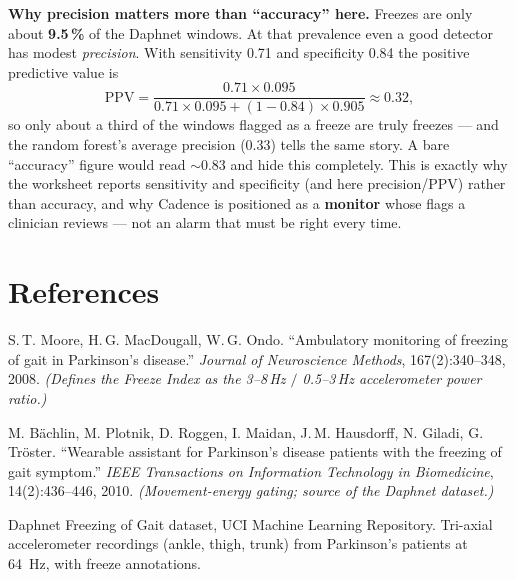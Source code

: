 \documentclass[11pt,a4paper]{article}
\begin{document}
\begin{keybox}
\textbf{Why precision matters more than ``accuracy'' here.} Freezes are only about
\textbf{9.5\,\%} of the Daphnet windows. At that prevalence even a good detector has
modest \emph{precision}. With sensitivity 0.71 and specificity 0.84 the positive
predictive value is
\[
\mathrm{PPV}=\frac{0.71\times0.095}{0.71\times0.095+(1-0.84)\times0.905}\approx 0.32,
\]
so only about a third of the windows flagged as a freeze are truly freezes --- and the
random forest's average precision (0.33) tells the same story. A bare ``accuracy''
figure would read $\sim$0.83 and hide this completely. This is exactly why the
worksheet reports sensitivity and specificity (and here precision/PPV) rather than
accuracy, and why Cadence is positioned as a \textbf{monitor} whose flags a clinician
reviews --- not an alarm that must be right every time.
\end{keybox}

\section*{References}
\begin{enumerate}[leftmargin=1.8em,label={[\arabic*]}]
\item S.\,T. Moore, H.\,G. MacDougall, W.\,G. Ondo. ``Ambulatory monitoring of
freezing of gait in Parkinson's disease.'' \emph{Journal of Neuroscience Methods},
167(2):340--348, 2008. \emph{(Defines the Freeze Index as the 3--8\,Hz $/$ 0.5--3\,Hz
accelerometer power ratio.)}
\item M. B\"achlin, M. Plotnik, D. Roggen, I. Maidan, J.\,M. Hausdorff, N. Giladi,
G. Tr\"oster. ``Wearable assistant for Parkinson's disease patients with the freezing
of gait symptom.'' \emph{IEEE Transactions on Information Technology in Biomedicine},
14(2):436--446, 2010. \emph{(Movement-energy gating; source of the Daphnet dataset.)}
\item Daphnet Freezing of Gait dataset, UCI Machine Learning Repository. Tri-axial
accelerometer recordings (ankle, thigh, trunk) from Parkinson's patients at
\SI{64}{\hertz}, with freeze annotations.
\end{enumerate}
\end{document}
